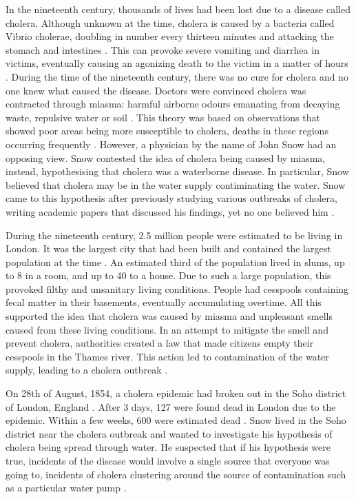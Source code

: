 \documentclass[12pt]{article}
\begin{document}
In the nineteenth century, thousands of lives had been lost due to a disease called cholera. Although unknown at the time, cholera is caused by a bacteria called Vibrio cholerae, doubling in number every thirteen minutes and attacking the stomach and intestines \cite{channel1}. This can provoke severe vomiting and diarrhea in victims, eventually causing an agonizing death to the victim in a matter of hours \cite{heros, channel1}. During the time of the nineteenth century, there was no cure for cholera and no one knew what caused the disease. Doctors were convinced cholera was contracted through miasma: harmful airborne odours emanating from decaying waste, repulsive water or soil \cite{test}. This theory was based on observations that showed poor areas being more susceptible to cholera, deaths in these regions occurring frequently \cite{heros}. However, a physician by the name of John Snow had an opposing view. Snow contested the idea of cholera being caused by miasma, instead, hypothesising that cholera was a waterborne disease. In particular, Snow believed that cholera may be in the water supply contiminating the water. Snow came to this hypothesis after previously studying various outbreaks of cholera, writing academic papers that discussed his findings, yet no one believed him \cite{original}. 

During the nineteenth century, 2.5 million people were estimated to be living in London. It was the largest city that had been built and contained the largest population at the time \cite{channel1, tedtalk}. An estimated third of the population lived in slums, up to 8 in a room, and up to 40 to a house. Due to such a large population, this provoked filthy and unsanitary living conditions. People had cesspools containing fecal matter in their basements, eventually accumulating overtime. All this supported the idea that cholera was caused by miasma and unpleasant smells caused from these living conditions. In an attempt to mitigate the smell and prevent cholera, authorities created a law that made citizens empty their cesspools in the Thames river. This action led to contamination of the water supply, leading to a cholera outbreak \cite{tedtalk, johnson}. 

On 28th of August, 1854, a cholera epidemic had broken out in the Soho district of London, England \cite{tedtalk}. After 3 days, 127 were found dead in London due to the epidemic. Within a few weeks, 600 were estimated dead \cite{youtube, tedtalk}. Snow lived in the Soho district near the cholera outbreak and wanted to investigate his hypothesis of cholera being spread through water. He suspected that if his hypothesis were true, incidents of the disease would involve a single source that everyone was going to, incidents of cholera clustering around the source of contamination such as a particular water pump \cite{test, tedtalk, johnson}. 
\end{document}
